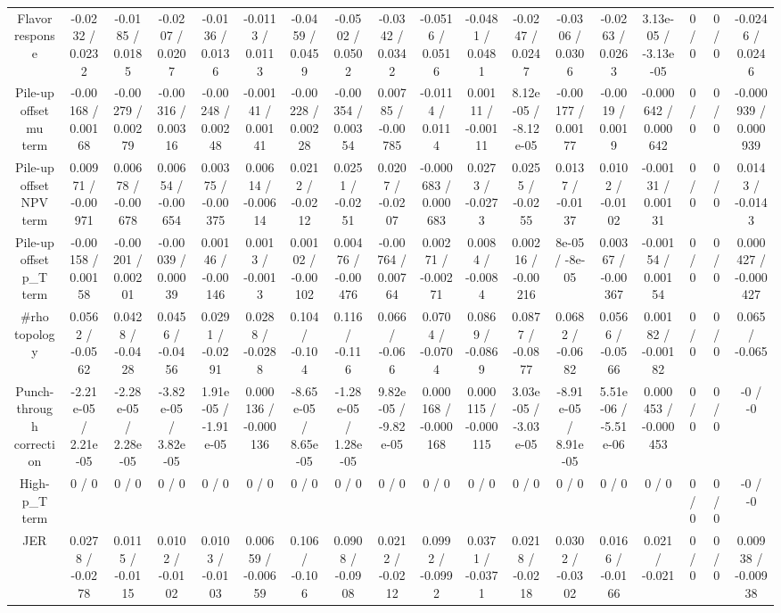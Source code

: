 \documentclass[10pt]{article}
\begin{document}
\begin{table}[htbp]
\begin{center}
\begin{tabular}{|c|c|c|c|c|c|c|c|c|c|c|c|c|c|c|c|c|c|}
  Flavor response & -0.0232 / 0.0232 & -0.0185 / 0.0185 & -0.0207 / 0.0207 & -0.0136 / 0.0136 & -0.0113 / 0.0113 & -0.0459 / 0.0459 & -0.0502 / 0.0502 & -0.0342 / 0.0342 & -0.0516 / 0.0516 & -0.0481 / 0.0481 & -0.0247 / 0.0247 & -0.0306 / 0.0306 & -0.0263 / 0.0263 & 3.13e-05 / -3.13e-05 & 0 / 0 & 0 / 0 & -0.0246 / 0.0246 \\ 
  Pile-up offset mu term & -0.00168 / 0.00168 & -0.00279 / 0.00279 & -0.00316 / 0.00316 & -0.00248 / 0.00248 & -0.00141 / 0.00141 & -0.00228 / 0.00228 & -0.00354 / 0.00354 & 0.00785 / -0.00785 & -0.0114 / 0.0114 & 0.00111 / -0.00111 & 8.12e-05 / -8.12e-05 & -0.00177 / 0.00177 & -0.0019 / 0.0019 & -0.000642 / 0.000642 & 0 / 0 & 0 / 0 & -0.000939 / 0.000939 \\ 
  Pile-up offset NPV term & 0.00971 / -0.00971 & 0.00678 / -0.00678 & 0.00654 / -0.00654 & 0.00375 / -0.00375 & 0.00614 / -0.00614 & 0.0212 / -0.0212 & 0.0251 / -0.0251 & 0.0207 / -0.0207 & -0.000683 / 0.000683 & 0.0273 / -0.0273 & 0.0255 / -0.0255 & 0.0137 / -0.0137 & 0.0102 / -0.0102 & -0.00131 / 0.00131 & 0 / 0 & 0 / 0 & 0.0143 / -0.0143 \\ 
  Pile-up offset p_{T} term & -0.00158 / 0.00158 & -0.00201 / 0.00201 & -0.00039 / 0.00039 & 0.00146 / -0.00146 & 0.0013 / -0.0013 & 0.00102 / -0.00102 & 0.00476 / -0.00476 & -0.00764 / 0.00764 & 0.00271 / -0.00271 & 0.0084 / -0.0084 & 0.00216 / -0.00216 & 8e-05 / -8e-05 & 0.00367 / -0.00367 & -0.00154 / 0.00154 & 0 / 0 & 0 / 0 & 0.000427 / -0.000427 \\ 
  #rho topology & 0.0562 / -0.0562 & 0.0428 / -0.0428 & 0.0456 / -0.0456 & 0.0291 / -0.0291 & 0.0288 / -0.0288 & 0.104 / -0.104 & 0.116 / -0.116 & 0.066 / -0.066 & 0.0704 / -0.0704 & 0.0869 / -0.0869 & 0.0877 / -0.0877 & 0.0682 / -0.0682 & 0.0566 / -0.0566 & 0.00182 / -0.00182 & 0 / 0 & 0 / 0 & 0.065 / -0.065 \\ 
  Punch-through correction & -2.21e-05 / 2.21e-05 & -2.28e-05 / 2.28e-05 & -3.82e-05 / 3.82e-05 & 1.91e-05 / -1.91e-05 & 0.000136 / -0.000136 & -8.65e-05 / 8.65e-05 & -1.28e-05 / 1.28e-05 & 9.82e-05 / -9.82e-05 & 0.000168 / -0.000168 & 0.000115 / -0.000115 & 3.03e-05 / -3.03e-05 & -8.91e-05 / 8.91e-05 & 5.51e-06 / -5.51e-06 & 0.000453 / -0.000453 & 0 / 0 & 0 / 0 & -0 / -0 \\ 
  High-p_{T} term & 0 / 0 & 0 / 0 & 0 / 0 & 0 / 0 & 0 / 0 & 0 / 0 & 0 / 0 & 0 / 0 & 0 / 0 & 0 / 0 & 0 / 0 & 0 / 0 & 0 / 0 & 0 / 0 & 0 / 0 & 0 / 0 & -0 / -0 \\ 
  JER & 0.0278 / -0.0278 & 0.0115 / -0.0115 & 0.0102 / -0.0102 & 0.0103 / -0.0103 & 0.00659 / -0.00659 & 0.106 / -0.106 & 0.0908 / -0.0908 & 0.0212 / -0.0212 & 0.0992 / -0.0992 & 0.0371 / -0.0371 & 0.0218 / -0.0218 & 0.0302 / -0.0302 & 0.0166 / -0.0166 & 0.021 / -0.021 & 0 / 0 & 0 / 0 & 0.00938 / -0.00938 \\ 

\end{tabular}
\end{center}
\end{table}
\end{document}
